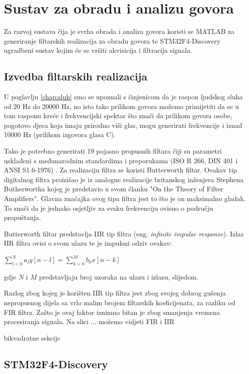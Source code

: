\documentclass[times, utf8, diplomski]{fer}
\begin{document}
\chapter{Sustav za obradu i analizu govora}
Za razvoj sustava čija je svrha obrada i analiza govora koristi se MATLAB za generiranje filtarskih realizacija za obradu govora te STM32F4-Discovery ugradbeni sustav kojim će se vršiti akvizicija i filtracija signala.

\section{Izvedba filtarskih realizacija}
U poglavlju \ref{chap:sluh} smo se upoznali s činjenicom da je raspon ljudskog sluha od 20 Hz do 20000 Hz, no isto tako prilikom govora možemo primijetiti da se u tom rasponu kreće i frekvencijski spektar što znači da prilikom govora osobe, pogotovo djeca koja imaju prirodno viši glas, mogu generirati frekvencije i iznad 10000 Hz (prilikom izgovora glasa C). 

Tako je potrebno generirati 19 pojasno propusnih filtara  čiji su parametri usklađeni s međunarodnim standardima i preporukama (ISO R 266, DIN 401 i ANSI S1.6-1976) \citep{optimala}. 
Za realizaciju filtra se koristi Butterworth filtar. Ovakav tip digitalnog filtra proizišao je iz analogne realizacije britanskog inženjera Stephena Butherwortha kojeg je predstavio u svom članku "On the Theory of Filter Amplifiers". Glavna značajka ovog tipa filtra jest to što je on maksimalno gladak. To znači da je jednako osjetljiv za svaku frekvenciju ovisno o području propuštanja.

Butterworth filtar predstavlja IIR tip filtra (eng. \textit{infinite impulse response}). Izlaz IIR filtra ovisi o svom ulazu te je impulsni odziv ovakav:


$\sum_{l=0}^{N}a_{l}y[n-l] = \sum_{k=0}^{M}b_{k}x[n-k]$


gdje $N$ i $M$ predstavljaju broj uzoraka na ulazu i izlazu, slijedom.

Razlog zbog kojeg je korišten IIR tip filtra jest zbog svojeg dobrog gušenja nepropusnog dijela sa vrlo malim brojem filtarskih koeficijenata, za razliku od FIR filtra. Zašto je ovaj faktor iznimno bitan je zbog smanjenja vremena procesiranja signala. Na slici ... možemo vidjeti FIR i IIR

bikvadratne sekcije

\section{STM32F4-Discovery}
\end{document}
